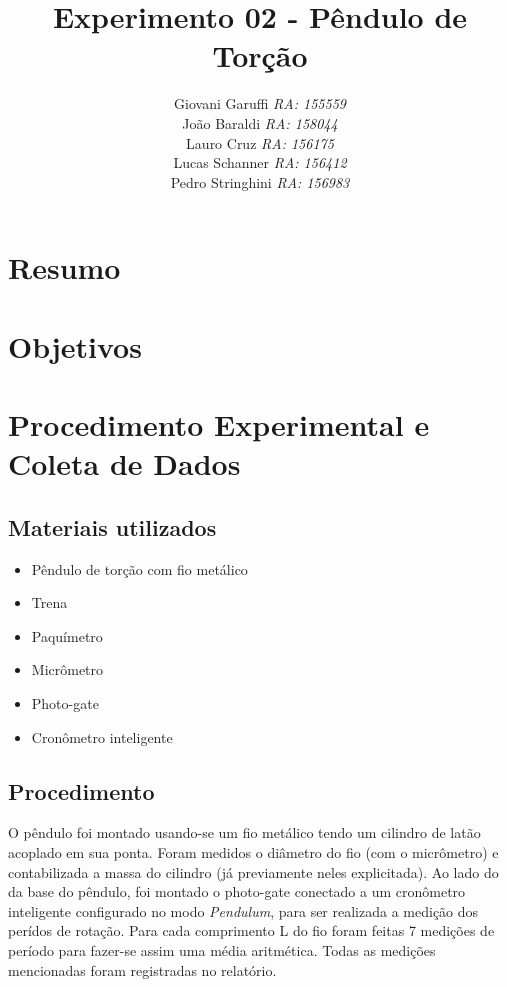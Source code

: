 \documentclass[12pt,a4paper]{article}
\begin{document}
\title{\vspace{70mm}\Huge Experimento 02 - Pêndulo de Torção}
\author{ Giovani Garuffi\qquad\hfill
		\textit {RA: 155559}\protect\\
		João Baraldi\hfill
		\textit{RA: 158044}\protect\\
		Lauro Cruz\hfill
		\textit{RA: 156175}\protect\\
		Lucas Schanner\hfill
		\textit{RA: 156412}\protect\\
		Pedro Stringhini\hfill
		\textit {RA: 156983}								
		}
\maketitle
\newpage
\section{Resumo}


\section{Objetivos}


\section{Procedimento Experimental e Coleta de Dados}

\subsection{Materiais utilizados}
\begin{itemize}
	\item Pêndulo de torção com fio metálico
	\item Trena
	\item Paquímetro
	\item Micrômetro
	\item Photo-gate
	\item Cronômetro inteligente
\end{itemize}

\subsection{Procedimento}
O pêndulo foi montado usando-se um fio metálico tendo um cilindro de latão acoplado em sua ponta. Foram medidos o diâmetro do fio (com o micrômetro) e contabilizada a massa do cilindro (já previamente neles explicitada). Ao lado do da base do pêndulo, foi montado o photo-gate conectado a um cronômetro inteligente configurado no modo \emph{Pendulum}, para ser realizada a medição dos perídos de rotação. Para cada comprimento L do fio foram feitas 7 medições de período para fazer-se assim uma média aritmética. Todas as medições mencionadas foram registradas no relatório. 
\end{document}
